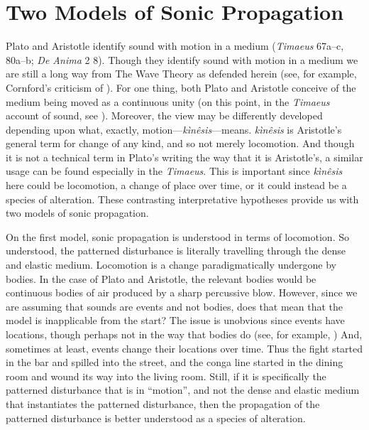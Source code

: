 \documentclass[12pt]{article}
\begin{document}
\section{Two Models of Sonic Propagation} %
\label{sec:two_models_of_sonic_propagation}

Plato and Aristotle identify sound with motion in a medium (\emph{Timaeus} 67a–c, 80a–b; \emph{De Anima} 2 8). Though they identify sound with motion in a medium we are still a long way from The Wave Theory as defended herein (see, for example, Cornford's \citeyear[320 n.1]{Cornford:1935fk} criticism of \citealt{Archer-Hind:1888qd}). For one thing, both Plato and Aristotle conceive of the medium being moved as a continuous unity (on this point, in the \emph{Timaeus} account of sound, see \citealt[109]{Beare:1906uq}). Moreover, the view may be differently developed depending upon what, exactly, motion---\emph{kìnêsis}---means. \emph{kìnêsis} is Aristotle's general term for change of any kind, and so not merely locomotion. And though it is not a technical term in Plato's writing the way that it is Aristotle's, a similar usage can be found especially in the \emph{Timaeus}. This is important since \emph{kìnêsis} here could be locomotion, a change of place over time, or it could instead be a species of alteration. These contrasting interpretative hypotheses provide us with two models of sonic propagation.

On the first model, sonic propagation is understood in terms of locomotion. So understood, the patterned disturbance is literally travelling through the dense and elastic medium. Locomotion is a change paradigmatically undergone by bodies. In the case of Plato and Aristotle, the relevant bodies would be continuous bodies of air produced by a sharp percussive blow. However, since we are assuming that sounds are events and not bodies, does that mean that the model is inapplicable from the start? The issue is unobvious since events have locations, though perhaps not in the way that bodies do (see, for example, \citealt{Davidson:1969da}) And, sometimes at least, events change their locations over time. Thus the fight started in the bar and spilled into the street, and the conga line started in the dining room and wound its way into the living room. Still, if it is specifically the patterned disturbance that is in ``motion'', and not the dense and elastic medium that instantiates the patterned disturbance, then the propagation of the patterned disturbance is better understood as a species of alteration.
\end{document}
